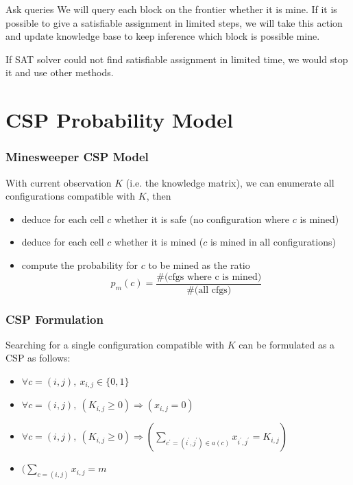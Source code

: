 \documentclass[aspectratio=169]{beamer}
\begin{document}
\begin{frame}{Ask queries}
    We will query each block on the frontier whether it is mine. If it is possible to give a satisfiable assignment in limited steps, we will take this action and update knowledge base to keep inference which block is possible mine.
    
    If SAT solver could not find satisfiable assignment in limited time, we would stop it and use other methods.
\end{frame}

\section{CSP Probability Model}

\begin{frame}
	\frametitle{Minesweeper CSP Model}
	With current observation $K$ (i.e. the knowledge matrix), we can enumerate all configurations compatible with $K$, then
	\begin{itemize}
		\item deduce for each cell $c$ whether it is safe (no configuration where $c$ is mined)
		\item deduce for each cell $c$ whether it is mined ($c$ is mined in all configurations)
		\item compute the probability for $c$ to be mined as the ratio $$ p_m(c) = \frac{\mbox{\# (cfgs where c is mined)}}{\mbox{\# (all cfgs)}} $$

	\end{itemize}
\end{frame}

\begin{frame}
	\frametitle{CSP Formulation}
	Searching for a single configuration compatible with $K$ can be formulated as a CSP as follows:

	\begin{itemize}
		\item ${\forall}c=(i,j),\ x_{i,j} \in \{0,1\} $
		\item ${\forall}c=(i,j),\ (K_{i,j} \geq 0) \Rightarrow (x_{i,j}=0)$
		\item ${\forall}c=(i,j),\ (K_{i,j} \geq 0) \Rightarrow (\sum_{c^{\prime}=(i^{\prime},j^{\prime}) \in a(c)} x_{i^{\prime},j^{\prime}} = K_{i,j})$
		\item $(\sum_{c=(i,j)} x_{i,j} = m$
	\end{itemize}
\end{frame}
\end{document}
